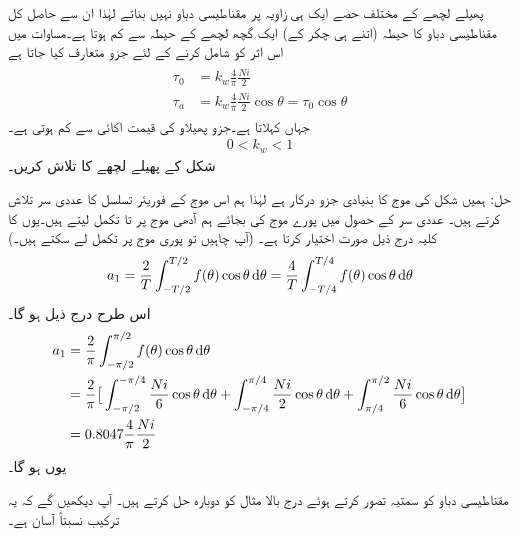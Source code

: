 پھیلے لچھے کے مختلف حصے ایک ہی زاویہ پر مقناطیسی دباو نہیں بناتے لہٰذا ان سے حاصل کل مقناطیسی دباو کا حیطہ  (اتنے ہی چکر کے) ایک گچھ لچھے   کے حیطہ سے  کم ہوتا ہے۔مساوات  میں اس اثر کو شامل کرنے کے لئے جزو   متعارف کیا جاتا ہے
\begin{gather}
\begin{aligned}
\tau_0&=k_w \frac{4}{\pi}\frac{N i}{2}\\
\tau_{a}&=k_w \frac{4}{\pi}\frac{N i}{2} \cos \theta=\tau_0 \cos \theta \label{مساوات_گھومتے_مشین_دباو_سائن_نما}
\end{aligned}
\end{gather}
جہاں     کہلاتا ہے۔جزو پھیلاو کی قیمت  اکائی سے کم ہوتی ہے۔
\begin{align}
0<k_w<1
\end{align}
%
شکل   کے  پھیلے لچھے کا   تلاش کریں۔

حل:\quad
ہمیں شکل  کی موج کا بنیادی جزو درکار ہے لہٰذا ہم اس موج کے فوریئر تسلسل کا عددی سر  تلاش کرتے ہیں۔ عددی سر کے حصول میں پورے موج کی بجائے ہم  آدھی موج پر  تا  تکمل لیتے ہیں۔یوں  کا کلیہ درج ذیل صورت اختیار کرتا ہے۔ (آپ چاہیں تو پوری موج پر تکمل لے سکتے ہیں۔)
\begin{align*}
a_1=\frac{2}{T}\int_{-T/2}^{T/2}f(\theta)\cos\theta\dif \theta=\frac{4}{T}\int_{-T/4}^{T/4}f(\theta)\cos\theta\dif\theta
\end{align*}
اس طرح درج ذیل ہو گا۔
\begin{align*}
a_1&=\frac{2}{\pi}\int_{-\pi/2}^{\pi/2}f(\theta)\cos \theta\dif \theta\\
&=\frac{2}{\pi}\big[\int_{-\pi/2}^{-\pi/4} \frac{Ni}{6}\cos\theta\dif \theta+\int_{-\pi/4}^{\pi/4}\frac{Ni}{2}\cos\theta\dif\theta+\int_{\pi/4}^{\pi/2}\frac{Ni}{6}\cos\theta\dif\theta\big]\\
&=0.8047 \frac{4}{\pi}\frac{Ni}{2}
\end{align*}
یوں  ہو گا۔

مقناطیسی دباو کو سمتیہ تصور کرتے ہوئے درج بالا مثال کو دوبارہ حل کرتے ہیں۔ آپ دیکھیں گے کہ یہ ترکیب نسبتاً آسان ہے۔ 

